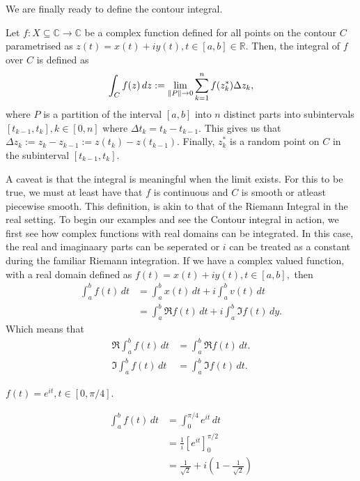 \documentclass[12pt]{book}
\begin{document}
We are finally ready to define the contour integral. 

\begin{defn}
    Let $f: X \subseteq \mathbb{C} \rightarrow \mathbb{C}$ be a complex function defined for all points on the contour $C$ parametrised as $z(t) = x(t) + iy(t), t \in [a, b] \in \mathbb{R}.$ Then, the integral of $f$ over $C$ is defined as
    \[
        \int_{C} f(z)\,dz := \lim_{\left\lVert P \right\rVert \rightarrow 0} \sum_{k = 1}^{n}f(z^{*}_{k})\Delta z_{k},
    \]
    where $P$ is a partition of the interval $[a, b]$ into $n$ distinct parts into subintervals $[t_{k - 1}, t_{k}], k \in [0, n]$ where $\Delta t_{k} = t_{k} - t_{k - 1}.$ This gives us that $\Delta z_{k} := z_{k} - z_{k - 1} := z(t_{k}) - z(t_{k - 1}).$ Finally, $z^{*}_{k}$ is a random point on $C$ in the subinterval $[t_{k - 1}, t_{k}].$
\end{defn}
A caveat is that the integral is meaningful when the limit exists. For this to be true, we must at least have that $f$ is continuous and $C$ is smooth or atleast piecewise smooth. This definition, is akin to that of the Riemann Integral in the real setting. To begin our examples and see the Contour integral in action, we first see how complex functions with real domains can be integrated. In this case, the real and imaginaary parts can be seperated or $i$ can be treated as a constant during the familiar Riemann integration. If we have a complex valued function, with a real domain defined as $f(t) = x(t) + iy(t), t \in [a, b],$ then
\begin{align*}
    \int_{a}^{b} f(t)\,dt
        &=
            \int_{a}^{b} x(t)\,dt + i\int_{a}^{b} v(t)\,dt \\
        &=
            \int_{a}^{b} \Re f(t)\,dt + i\int_{a}^{b} \Im f(t)\,dy.
\end{align*}
Which means that 
\begin{align*}
    \Re \int_{a}^{b} f(t)\,dt
        &= 
            \int_{a}^{b} \Re f(t)\,dt. \\
    \Im \int_{a}^{b} f(t)\,dt
        &= 
            \int_{a}^{b} \Im f(t)\,dt.
\end{align*}

\begin{exmp}
    $f(t) = e^{it}, t \in [0, \pi / 4].$
\end{exmp}
\begin{align*}
    \int_{a}^{b} f(t)\,dt
        &=
            \int_{0}^{\pi / 4} e^{it}\,dt \\
        &=
            \frac{1}{i}
            \left[
                e^{it}
            \right]_{0}^{\pi / 2} \\
        &=
            \frac{1}{\sqrt{2}} + i\left(1 - \frac{1}{\sqrt{2}}\right)
\end{align*}
\end{document}
